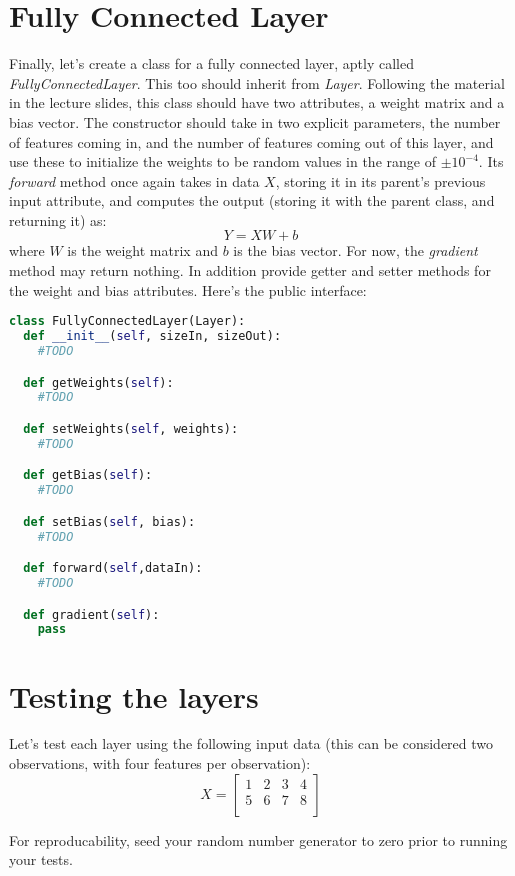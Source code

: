 \documentclass[12pt]{article}
\begin{document}
\section{Fully Connected Layer}
Finally, let's create a class for a fully connected layer, aptly called \emph{FullyConnectedLayer}.  This too should inherit from \emph{Layer}.  Following the material in the lecture slides, this class should have two attributes, a weight matrix and a bias vector.  The constructor should take in two explicit parameters, the number of features coming in, and the number of features coming out of this layer, and use these to initialize the weights to be random values in the range of $\pm 10^{-4}$.   Its \emph{forward} method once again takes in data $X$, storing it in its parent's previous input attribute, and computes the output (storing it with the parent class, and returning it) as:
$$Y = XW+b$$
where $W$ is the weight matrix and $b$ is the bias vector.  For now, the \emph{gradient} method may return nothing.  In addition provide getter and setter methods for the weight and bias attributes.  Here's the public interface:
\begin{lstlisting}[language=Python]
class FullyConnectedLayer(Layer):
  def __init__(self, sizeIn, sizeOut):
    #TODO

  def getWeights(self):
    #TODO

  def setWeights(self, weights):
    #TODO

  def getBias(self):
    #TODO

  def setBias(self, bias):
    #TODO

  def forward(self,dataIn):
    #TODO

  def gradient(self):
    pass
\end{lstlisting}


\newpage
\section{Testing the layers}
Let's test each layer using the following input data (this can be considered two observations, with four features per observation):
$$X = \begin{bmatrix}
1 & 2 & 3 & 4\\
5 & 6 & 7 & 8\\
\end{bmatrix}$$

\noindent
For reproducability, seed your random number generator to zero prior to running your tests.\\
\end{document}

